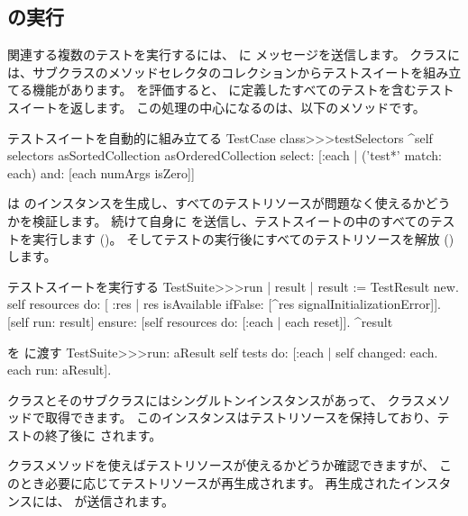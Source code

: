 \documentclass[a4paper,10pt,twoside]{book}
\begin{document}
\subsection{ の実行}

関連する複数のテストを実行するには、 に  メッセージを送信します。
 クラスには、サブクラスのメソッドセレクタのコレクションからテストスイートを組み立てる機能があります。
 を評価すると、 に定義したすべてのテストを含むテストスイートを返します。
この処理の中心になるのは、以下のメソッドです。
\begin{method}[testcasetestselectors]{テストスイートを自動的に組み立てる}
TestCase class>>>testSelectors 
	^self selectors asSortedCollection asOrderedCollection select: [:each | 
		('test*' match: each) and: [each numArgs isZero]]
\end{method}

 は  のインスタンスを生成し、すべてのテストリソースが問題なく使えるかどうかを検証します。
続けて自身に  を送信し、テストスイートの中のすべてのテストを実行します ()。
そしてテストの実行後にすべてのテストリソースを解放 () します。
\begin{method}[testsuiterun]{テストスイートを実行する}
TestSuite>>>run
	| result |
 	result := TestResult new.
	self resources do: [ :res |
		res isAvailable ifFalse: [^res signalInitializationError]].
	[self run: result] ensure: [self resources do: [:each | each reset]].
	^result
\end{method}

\begin{method}[testsuiterun:]{ を  に渡す}
TestSuite>>>run: aResult
	self tests do: [:each | 
		self changed: each.
		each run: aResult].
\end{method}
 クラスとそのサブクラスにはシングルトンインスタンスがあって、 クラスメソッドで取得できます。
このインスタンスはテストリソースを保持しており、テストの終了後に  されます。

 クラスメソッドを使えばテストリソースが使えるかどうか確認できますが、
このとき必要に応じてテストリソースが再生成されます。
再生成されたインスタンスには、 が送信されます。
\end{document}
